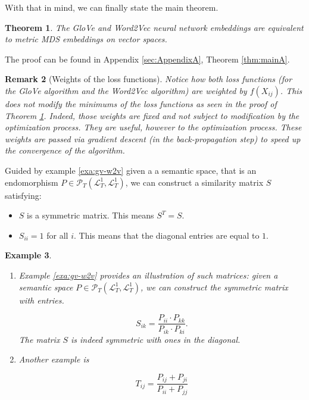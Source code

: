 \documentclass[10pt,a4paper]{elsarticle}
\renewcommand{\L}{\mathcal{L}}
\renewcommand{\P}{\mathcal{P}}
\newtheorem{theorem}{Theorem}[section]
\newtheorem{exa}[theorem]{Example}
\newtheorem{re}[theorem]{Remark}
\begin{document}
With that in mind, we can finally state the main theorem.

\begin{theorem}\label{thm:main}
	The GloVe and Word2Vec neural network embeddings are equivalent to metric MDS embeddings on vector spaces.
\end{theorem}

The proof can be found in Appendix \ref{sec:AppendixA}, Theorem \ref{thm:mainA}.

\begin{re}[Weights of the loss functions]
	Notice how both loss functions (for the GloVe algorithm and the Word2Vec algorithm) are weighted by $f(X_{ij})$. This does not modify the minimums of the loss functions as seen in the proof of Theorem \ref{thm:main}. Indeed, those weights are fixed and not subject to modification by the optimization process. They are useful, however to the optimization process. These weights are passed via gradient descent (in the back-propagation step) to speed up the convergence of the algorithm. 
	
\end{re}


Guided by example \ref{exa:gv-w2v} given a a semantic space, that is an endomorphism $P\in \P_{T}(\L_{T}^{1},\L_{T}^{1})$, we can construct a similarity matrix $S$ satisfying:

\begin{itemize}
	\item $S$ is a symmetric matrix. This means $S^{T}=S$.
	\item $S_{ii}=1$ for all $i$. This means that the diagonal entries are equal to $1$.
\end{itemize}

\begin{exa}
	\begin{enumerate}
		\item Example \ref{exa:gv-w2v} provides an illustration of such matrices: given a semantic space $P\in \P_{T}(\L_{T}^{1},\L_{T}^{1})$, we can construct the symmetric matrix with entries.
		
		\begin{equation}
			S_{ik}=\frac{P_{ii}\cdot P_{kk}}{P_{ik}\cdot P_{ki}}.
		\end{equation}
		The matrix $S$ is indeed symmetric with ones in the diagonal.
		
		\item Another example is
		
		\begin{equation}
			T_{ij}=\frac{P_{ij}+P_{ji}}{P_{ii}+P_{jj}} 
		\end{equation}
	\end{enumerate}
	
	
\end{exa}
\end{document}
